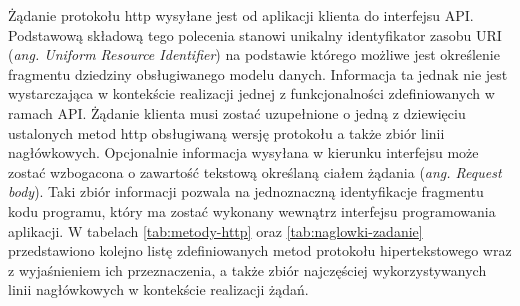 Żądanie protokołu http wysyłane jest od aplikacji klienta do interfejsu API. Podstawową składową tego polecenia stanowi unikalny identyfikator zasobu URI (\textit{ang. Uniform Resource Identifier}) na podstawie którego możliwe jest określenie fragmentu dziedziny obsługiwanego modelu danych. Informacja ta jednak nie jest wystarczająca w kontekście realizacji jednej z funkcjonalności zdefiniowanych w ramach API. Żądanie klienta musi zostać uzupełnione o jedną z dziewięciu ustalonych metod http obsługiwaną wersję protokołu a także zbiór linii nagłówkowych. Opcjonalnie informacja wysyłana w kierunku interfejsu może zostać wzbogacona o zawartość tekstową określaną ciałem żądania (\textit{ang. Request body}). Taki zbiór informacji pozwala na jednoznaczną identyfikacje fragmentu kodu programu, który ma zostać wykonany wewnątrz interfejsu programowania aplikacji. W tabelach \ref{tab:metody-http} oraz \ref{tab:naglowki-zadanie} przedstawiono kolejno listę zdefiniowanych metod protokołu hipertekstowego wraz z wyjaśnieniem ich przeznaczenia, a także zbiór najczęściej wykorzystywanych linii nagłówkowych w kontekście realizacji żądań.

